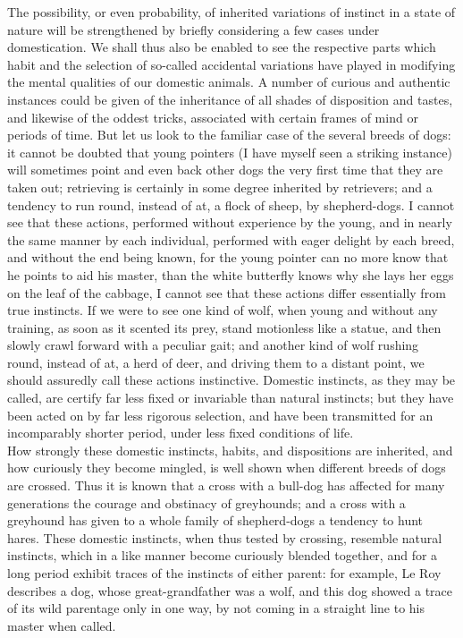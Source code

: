 \indent The possibility, or even probability, of inherited variations of instinct in a state of nature will be strengthened by briefly considering a few cases under domestication. We shall thus also be enabled to see the respective parts which habit and the selection of so-called accidental variations have played in modifying the mental qualities of our domestic animals. A number of curious and authentic instances could be given of the inheritance of all shades of disposition and tastes, and likewise of the oddest tricks, associated with certain frames of mind or periods of time. But let us look to the familiar case of the several breeds of dogs: it cannot be doubted that young pointers (I have myself seen a striking instance) will sometimes point and even back other dogs the very first time that they are taken out; retrieving is certainly in some degree inherited by retrievers; and a tendency to run round, instead of at, a flock of sheep, by shepherd-dogs. I cannot see that these actions, performed without experience by the young, and in nearly the same manner by each individual, performed with eager delight by each breed, and without the end being known, for the young pointer can no more know that he points to aid his master, than the white butterfly knows why she lays her eggs on the leaf of the cabbage, I cannot see that these actions differ essentially from true instincts. If we were to see one kind of wolf, when young and without any training, as soon as it scented its prey, stand motionless like a statue, and then slowly crawl forward with a peculiar gait; and another kind of wolf rushing round, instead of at, a herd of deer, and driving them to a distant point, we should assuredly call these actions instinctive.  Domestic instincts, as they may be called, are certify far less fixed or invariable than natural instincts; but they have been acted on by far less rigorous selection, and have been transmitted for an incomparably shorter period, under less fixed conditions of life.\\
\indent How strongly these domestic instincts, habits, and dispositions are inherited, and how curiously they become mingled, is well shown when different breeds of dogs are crossed. Thus it is known that a cross with a bull-dog has affected for many generations the courage and obstinacy of greyhounds; and a cross with a greyhound has given to a whole family of shepherd-dogs a tendency to hunt hares.  These domestic instincts, when thus tested by crossing, resemble natural instincts, which in a like manner become curiously blended together, and for a long period exhibit traces of the instincts of either parent: for example, Le Roy describes a dog, whose great-grandfather was a wolf, and this dog showed a trace of its wild parentage only in one way, by not coming in a straight line to his master when called.\\
